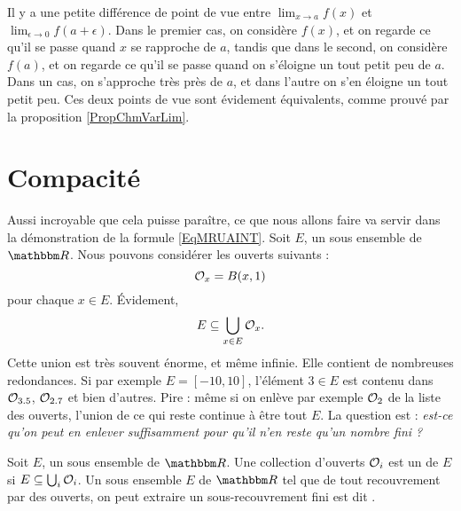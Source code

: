 Il y a une petite différence de point de vue entre $\lim_{x\to a}f(x)$ et $\lim_{\epsilon\to 0}f(a+\epsilon)$. Dans le premier cas, on considère $f(x)$, et on regarde ce qu'il se passe quand $x$ se rapproche de $a$, tandis que dans le second, on considère $f(a)$, et on regarde ce qu'il se passe quand on s'éloigne un tout petit peu de $a$. Dans un cas, on s'approche très près de $a$, et dans l'autre on s'en éloigne un tout petit peu. Ces deux points de vue sont évidement équivalents, comme prouvé par la proposition \ref{PropChmVarLim}.



					\section{Compacité}

Aussi incroyable que cela puisse paraître, ce que nous allons faire va servir dans la démonstration de la formule \eqref{EqMRUAINT}. Soit $E$, un sous ensemble de $\eR$. Nous pouvons considérer les ouverts suivants : 
\begin{equation}
	\mathcal{O}_x=B(x,1)
\end{equation}
pour chaque $x\in E$. Évidement,
\begin{equation}
	E\subseteq \bigcup_{x\in E}\mathcal{O}_x.
\end{equation}
Cette union est très souvent énorme, et même infinie. Elle contient de nombreuses redondances. Si par exemple $E=[-10,10]$, l'élément $3\in E$ est contenu dans $\mathcal{O}_{3.5}$, $\mathcal{O}_{2.7}$ et bien d'autres. Pire : même si on enlève par exemple $\mathcal{O}_2$ de la liste des ouverts, l'union de ce qui reste continue à être tout $E$. La question est : \emph{est-ce qu'on peut en enlever suffisamment pour qu'il n'en reste qu'un nombre fini ?}
\begin{definition}
Soit $E$, un sous ensemble de $\eR$. Une collection d'ouverts $\mathcal{O}_i$ est un  de $E$ si $E\subseteq \bigcup_{i}\mathcal{O}_i$. Un sous ensemble $E$ de $\eR$ tel que de tout recouvrement par des ouverts, on peut extraire un sous-recouvrement fini est dit .
\end{definition}

